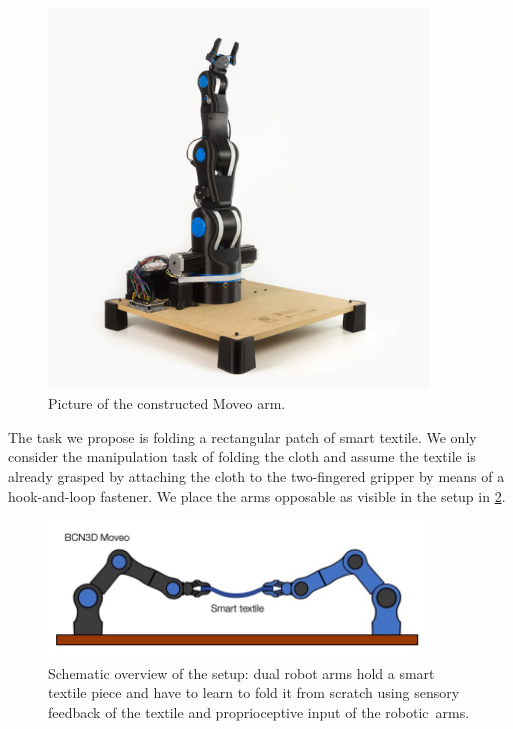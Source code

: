 \documentclass[\home/main.tex]{subfiles}
\begin{document}
\begin{figure}[htpb]
    \centering
    \includegraphics[width=0.9\textwidth, keepaspectratio]{figures/moveo_arm}
    \caption{Picture of the constructed Moveo arm.}
    \label{fig:moveo_arm}
\end{figure}

The task we propose is folding a rectangular patch of smart textile. We only consider the manipulation task of folding the cloth and assume the textile is already grasped by attaching the cloth to the two-fingered gripper by means of a hook-and-loop fastener. We place the arms opposable as visible in the setup in \cref{fig:setup_overview}.

\begin{figure}[htpb]
    \centering
    \includegraphics[width=0.9\textwidth, keepaspectratio]{figures/folding_overview_smaller.jpg}
    \caption[Schematic overview of setup to learn to fold with smart textile.]{Schematic overview of the setup: dual robot arms hold a smart textile piece and have to learn to fold it from scratch using sensory feedback of the textile and proprioceptive input of the robotic~arms. }
    \label{fig:setup_overview}
\end{figure}
\end{document}
